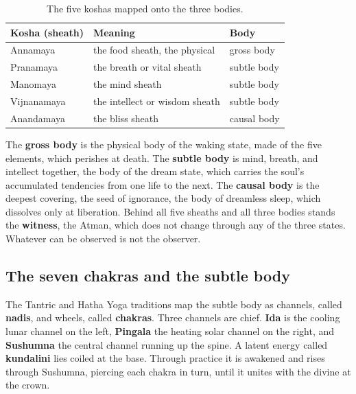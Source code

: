 \begin{longtable}{@{} L{0.26\textwidth}L{0.34\textwidth}L{0.26\textwidth}@{}}
\caption{The five koshas mapped onto the three bodies.}\\
\toprule
\textbf{Kosha (sheath)} & \textbf{Meaning} & \textbf{Body} \\
\midrule
Annamaya & the food sheath, the physical & gross body \\
Pranamaya & the breath or vital sheath & subtle body \\
Manomaya & the mind sheath & subtle body \\
Vijnanamaya & the intellect or wisdom sheath & subtle body \\
Anandamaya & the bliss sheath & causal body \\
\bottomrule
\end{longtable}

The \textbf{gross body} is the physical body of the waking state, made of the five elements, which perishes at death. The \textbf{subtle body} is mind, breath, and intellect together, the body of the dream state, which carries the soul's accumulated tendencies from one life to the next. The \textbf{causal body} is the deepest covering, the seed of ignorance, the body of dreamless sleep, which dissolves only at liberation. Behind all five sheaths and all three bodies stands the \textbf{witness}, the Atman, which does not change through any of the three states. Whatever can be observed is not the observer.

\subsection{The seven chakras and the subtle body}

The Tantric and Hatha Yoga traditions map the subtle body as channels, called \textbf{nadis}, and wheels, called \textbf{chakras}. Three channels are chief. \textbf{Ida} is the cooling lunar channel on the left, \textbf{Pingala} the heating solar channel on the right, and \textbf{Sushumna} the central channel running up the spine. A latent energy called \textbf{kundalini} lies coiled at the base. Through practice it is awakened and rises through Sushumna, piercing each chakra in turn, until it unites with the divine at the crown.

